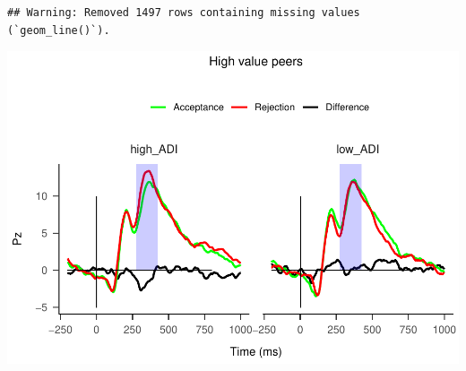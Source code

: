\documentclass[
]{article}
\begin{document}
\begin{verbatim}
## Warning: Removed 1497 rows containing missing values (`geom_line()`).
\end{verbatim}

\includegraphics{do01_BUDS_files/figure-latex/unnamed-chunk-11-1.pdf}
\end{document}
